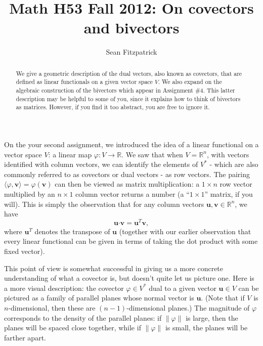 \documentclass[letterpaper,12pt]{article}
\title{Math H53 Fall 2012: On covectors and bivectors}
\author{Sean Fitzpatrick}
\newcommand{\uu}{\mathbf{u}}
\newcommand{\vv}{\mathbf{v}}
\newcommand{\dotp}{\boldsymbol{\cdot}}
\newcommand{\R}{\mathbb{R}}
\begin{document}
\maketitle

\begin{abstract}
We give a geometric description of the dual vectors, also known as covectors, that are defined as linear functionals on a given vector space $V$. We also expand on the algebraic construction of the bivectors which appear in Assignment \#4. This latter description may be helpful to some of you, since it explains how to think of bivectors as matrices. However, if you find it too abstract, you are free to ignore it.
\end{abstract}

On the your second assignment, we introduced the idea of a linear functional on a vector space $V$: a linear map $\varphi:V\to \R$. We saw that when $V=\R^n$, with vectors identified with column vectors, we can identify the elements of $V^*$ - which are also commonly referred to as covectors or dual vectors - as row vectors. The pairing $\langle \varphi, \vv\rangle = \varphi(\vv)$ can then be viewed as matrix multiplication: a $1\times n$ row vector multiplied by an $n\times 1$ column vector returns a number (a ``$1\times 1$'' matrix, if you will). This is simply the observation that for any column vectors $\uu,\vv\in \R^n$, we have
\[
\uu\dotp\vv = \uu^T\vv,
\]
where $\uu^T$ denotes the transpose of $\uu$ (together with our earlier observation that every linear functional can be given in terms of taking the dot product with some fixed vector).

This point of view is somewhat successful in giving us a more concrete understanding of what a covector is, but doesn't quite let us picture one. Here is a more visual description: the covector $\varphi\in V^*$ dual to a given vector $\uu\in V$ can be pictured as a family of parallel planes whose normal vector is $\uu$. (Note that if $V$ is $n$-dimensional, then these are $(n-1)$-dimensional planes.) The magnitude of $\varphi$ corresponds to the density of the parallel planes: if $\lVert\varphi\rVert$ is large, then the planes will be spaced close together, while if $\lVert\varphi\rVert$ is small, the planes will be farther apart.
\end{document}
